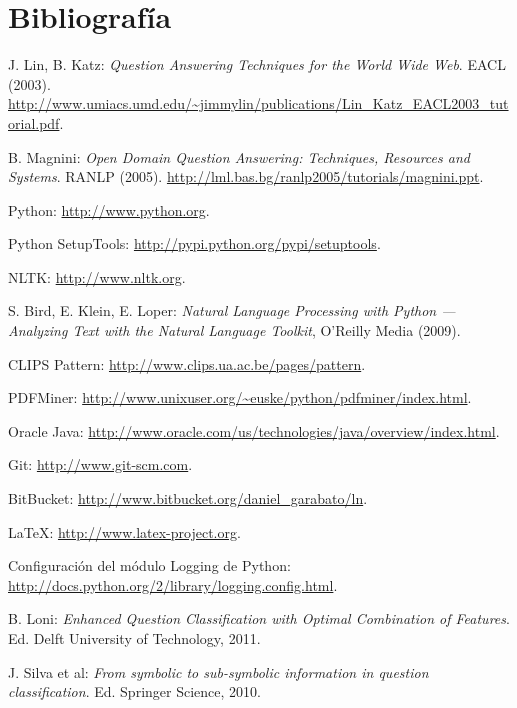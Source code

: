\documentclass[12pt,a4paper,titlepage]{article}
\begin{document}
\clearpage
\section{Bibliografía}
\begin{thebibliography}{99}

J. Lin, B. Katz: \emph{Question Answering Techniques for the World Wide Web}. EACL (2003). \url{http://www.umiacs.umd.edu/~jimmylin/publications/Lin_Katz_EACL2003_tutorial.pdf}.

B. Magnini: \emph{Open Domain Question Answering: Techniques, Resources and Systems}. RANLP (2005). \url{http://lml.bas.bg/ranlp2005/tutorials/magnini.ppt}.

Python: \url{http://www.python.org}.

Python SetupTools: \url{http://pypi.python.org/pypi/setuptools}.

NLTK: \url{http://www.nltk.org}.

S. Bird, E. Klein, E. Loper: \emph{Natural Language Processing with Python --- Analyzing Text with the Natural Language Toolkit}, O'Reilly Media (2009).

CLIPS Pattern: \url{http://www.clips.ua.ac.be/pages/pattern}.

PDFMiner: \url{http://www.unixuser.org/~euske/python/pdfminer/index.html}.

Oracle Java: \url{http://www.oracle.com/us/technologies/java/overview/index.html}.

Git: \url{http://www.git-scm.com}.

BitBucket: \url{http://www.bitbucket.org/daniel_garabato/ln}.

\LaTeX: \url{http://www.latex-project.org}.

Configuración del módulo Logging de Python: \url{http://docs.python.org/2/library/logging.config.html}.

B. Loni: \emph{Enhanced Question Classification with Optimal Combination of Features}. Ed. Delft University of Technology, 2011.

J. Silva et al: \emph{From symbolic to sub-symbolic information in question classification}. Ed. Springer Science, 2010.

\end{thebibliography}
\end{document}
